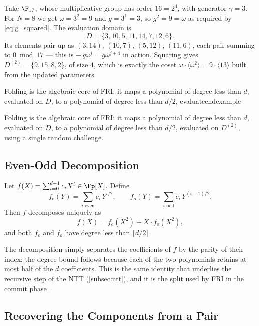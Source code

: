 \begin{example}
\label{ex:domain_f17}
Take $\F_{17}$, whose multiplicative group has order $16 = 2^4$, with
generator $\gamma = 3$. For $N = 8$ we get $\omega = 3^2 = 9$ and
$g = 3^1 = 3$, so $g^2 = 9 = \omega$ as required by
\cref{eq:g_squared}. The evaluation domain is
%
\[
D = \{3, 10, 5, 11, 14, 7, 12, 6\}.
\]
%
Its elements pair up as $(3,14)$, $(10,7)$, $(5,12)$, $(11,6)$, each
pair summing to $0 \bmod 17$ --- this is $-\,g\omega^{j} = g\omega^{j+4}$
in action. Squaring gives $D^{(2)} = \{9, 15, 8, 2\}$, of size $4$,
which is exactly the coset
$\omega\cdot\langle\omega^2\rangle = 9\cdot\langle 13\rangle$ built from
the updated parameters.
\end{example}


Folding is the algebraic core of FRI: it maps a polynomial of degree
less than $d$, evaluated on $D$, to a polynomial of degree less than
$d/2$, evaluateend{example}


Folding is the algebraic core of FRI: it maps a polynomial of degree
less than $d$, evaluated on $D$, to a polynomial of degree less than
$d/2$, evaluated on $D^{(2)}$, using a single random challenge.
 
 
\subsection{Even-Odd Decomposition}
\label{subsec:even_odd}
 
\begin{definition}
\label{def:even_odd}
Let $f(X) = \sum_{i=0}^{d-1} c_i X^i \in \Fp[X]$. Define
%
\[
f_{e}(Y) = \sum_{i \text{ even}} c_i \, Y^{i/2},
\qquad
f_{o}(Y) = \sum_{i \text{ odd}} c_i \, Y^{(i-1)/2}.
\]
%
Then $f$ decomposes uniquely as
%
\begin{equation}
\label{eq:even_odd}
f(X) = f_{e}(X^2) + X \cdot f_{o}(X^2),
\end{equation}
%
and both $f_e$ and $f_o$ have degree less than $\lceil d/2 \rceil$.
\end{definition}
 
The decomposition simply separates the coefficients of $f$ by the
parity of their index; the degree bound follows because each of the two
polynomials retains at most half of the $d$ coefficients. This is the
same identity that underlies the recursive step of the NTT
(\cref{subsec:ntt}), and it is the split used by FRI in the commit
phase~\cite[Section~3.9.1]{ethSTARK}.
 
 
\subsection{Recovering the Components from a Pair}
\label{subsec:recovering}
 
